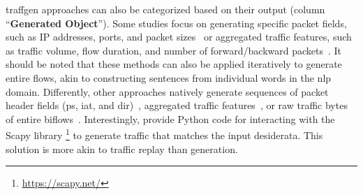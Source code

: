 \gls{traffgen} approaches can also be categorized based on their output (column ``\textbf{Generated Object}''). 
Some studies focus on generating specific packet fields, such as IP addresses, ports, and packet sizes~\cite{meng2023netgpt, wang2024lens, qu2024trafficgpt, wolf2024} or aggregated traffic features, such as traffic volume, flow duration, and number of forward/backward packets~\cite{zhang2024netdiff, wolf2024}. 
It should be noted that these methods can also be applied iteratively to generate entire flows, akin to constructing sentences from individual words in the \gls{nlp} domain.
Differently, other approaches natively generate sequences of packet header fields (\eg \gls{ps}, \gls{iat}, and \gls{dir})~\cite{bikmukhamedov2021, sivaroopan2023netdiffus}, aggregated traffic features~\cite{sivaroopan2023netdiffus}, or raw traffic bytes of entire biflows~\cite{jiang2024netdiffusion, chu2024mamba}.
Interestingly, \citet{Kholgh2023PACGPT} provide Python code for interacting with the Scapy library%
\footnote{\url{https://scapy.net/}} 
to generate traffic that matches the input desiderata. This solution
is more akin to traffic replay than generation.


